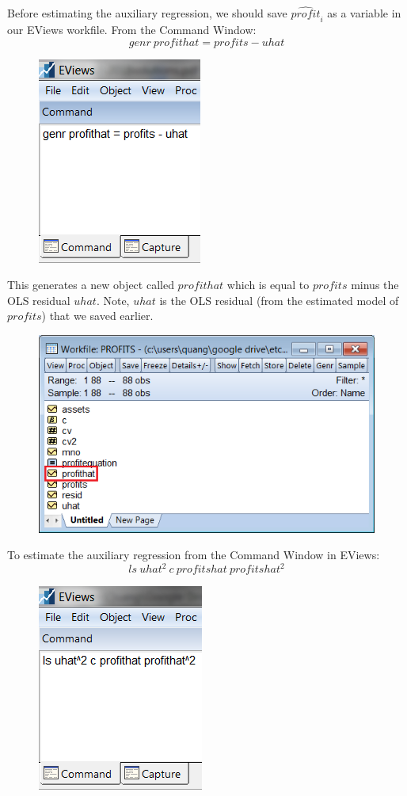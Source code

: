 \documentclass[12pt]{report}
\begin{document}
\noindent Before estimating the auxiliary regression, we should save $\widehat{profit}_i$ as a variable in our EViews workfile. From the Command Window: $$genr\ profithat = profits-uhat$$
\begin{figure}[H]
	\centering
	\includegraphics{tute9_6}
\end{figure}
\vspace{-\baselineskip} \noindent This generates a new object called $profithat$ which is equal to $profits$ minus the OLS residual $uhat$. Note, $uhat$ is the OLS residual (from the estimated model of $profits$) that we saved earlier.
\begin{figure}[H]
	\centering
	\includegraphics{tute9_7}
\end{figure}
\vspace{-\baselineskip} \noindent To estimate the auxiliary regression from the Command Window in EViews: $$ls\ uhat^2\ c\ profitshat\ profitshat^2$$
\begin{figure}[H]
	\centering
	\includegraphics{tute9_8}
\end{figure}
\vspace{-\baselineskip}
\end{document}
